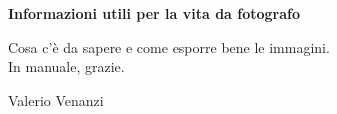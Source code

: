 \begin{titlepage}
    \begin{center}
        
        \vspace*{1cm}
            
        \LARGE
        \textbf{Informazioni utili per la vita da fotografo}
            
        \vspace{0.5cm}
        \large
        Cosa c'è da sapere e come esporre bene le immagini.\\
        In manuale, grazie.

        \vspace*{\fill}
        Valerio Venanzi

    \end{center}
\end{titlepage}



